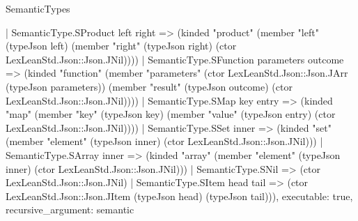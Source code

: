\begin{lexlean}{SemanticTypes}
\begin{semanticmodule}
{    | SemanticType.SProduct left right => (kinded "product" (member "left" (typeJson left) (member "right" (typeJson right) (ctor LexLeanStd.Json::Json.JNil))))
    | SemanticType.SFunction parameters outcome => (kinded "function" (member "parameters" (ctor LexLeanStd.Json::Json.JArr (typeJson parameters)) (member "result" (typeJson outcome) (ctor LexLeanStd.Json::Json.JNil))))
    | SemanticType.SMap key entry => (kinded "map" (member "key" (typeJson key) (member "value" (typeJson entry) (ctor LexLeanStd.Json::Json.JNil))))
    | SemanticType.SSet inner => (kinded "set" (member "element" (typeJson inner) (ctor LexLeanStd.Json::Json.JNil)))
    | SemanticType.SArray inner => (kinded "array" (member "element" (typeJson inner) (ctor LexLeanStd.Json::Json.JNil)))
    | SemanticType.SNil => (ctor LexLeanStd.Json::Json.JNil)
    | SemanticType.SItem head tail => (ctor LexLeanStd.Json::Json.JItem (typeJson head) (typeJson tail))),
  executable: true,
  recursive_argument: semantic
}


\end{semanticmodule}
\end{lexlean}
